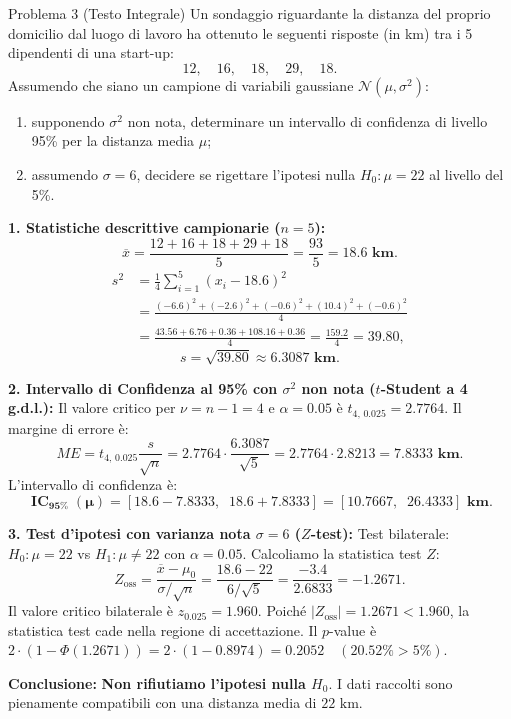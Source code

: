 \documentclass[11pt,a4paper]{article}
\begin{document}
\begin{problemabox}{Problema 3 (Testo Integrale)}
Un sondaggio riguardante la distanza del proprio domicilio dal luogo di lavoro ha ottenuto le seguenti risposte (in km) tra i 5 dipendenti di una start-up:
\[
12, \quad 16, \quad 18, \quad 29, \quad 18.
\]
Assumendo che siano un campione di variabili gaussiane $\mathcal{N}(\mu, \sigma^2)$:
\begin{enumerate}
    \item supponendo $\sigma^2$ non nota, determinare un intervallo di confidenza di livello 95\% per la distanza media $\mu$;
    \item assumendo $\sigma = 6$, decidere se rigettare l'ipotesi nulla $H_0: \mu = 22$ al livello del 5\%.
\end{enumerate}
\end{problemabox}

\begin{soluzionebox}
\textbf{1. Statistiche descrittive campionarie ($n = 5$):}
\[
\overline{x} = \frac{12 + 16 + 18 + 29 + 18}{5} = \frac{93}{5} = \mathbf{18.6\text{ km}}.
\]
\begin{align*}
s^2 &= \frac{1}{4} \sum_{i=1}^5 (x_i - 18.6)^2 \\
&= \frac{(-6.6)^2 + (-2.6)^2 + (-0.6)^2 + (10.4)^2 + (-0.6)^2}{4} \\
&= \frac{43.56 + 6.76 + 0.36 + 108.16 + 0.36}{4} = \frac{159.2}{4} = \mathbf{39.80},
\end{align*}
\[
s = \sqrt{39.80} \approx \mathbf{6.3087\text{ km}}.
\]

\textbf{2. Intervallo di Confidenza al 95\% con $\sigma^2$ non nota ($t$-Student a 4 g.d.l.):}
Il valore critico per $\nu = n-1 = 4$ e $\alpha = 0.05$ è $t_{4, \, 0.025} = 2.7764$.
Il margine di errore è:
\[
ME = t_{4, \, 0.025} \frac{s}{\sqrt{n}} = 2.7764 \cdot \frac{6.3087}{\sqrt{5}} = 2.7764 \cdot 2.8213 = \mathbf{7.8333\text{ km}}.
\]
L'intervallo di confidenza è:
\[
\mathbf{\operatorname{IC}_{95\%}(\mu) = [18.6 - 7.8333, \;\; 18.6 + 7.8333] = [10.7667, \;\; 26.4333]\text{ km}}.
\]

\textbf{3. Test d'ipotesi con varianza nota $\sigma = 6$ ($Z$-test):}
Test bilaterale: $H_0: \mu = 22$ vs $H_1: \mu \neq 22$ con $\alpha = 0.05$.
Calcoliamo la statistica test $Z$:
\[
Z_{\text{oss}} = \frac{\overline{x} - \mu_0}{\sigma/\sqrt{n}} = \frac{18.6 - 22}{6/\sqrt{5}} = \frac{-3.4}{2.6833} = \bm{-1.2671}.
\]
Il valore critico bilaterale è $z_{0.025} = 1.960$.
Poiché $|Z_{\text{oss}}| = 1.2671 < 1.960$, la statistica test cade nella regione di accettazione.
Il $p$-value è $2 \cdot (1 - \Phi(1.2671)) = 2 \cdot (1 - 0.8974) = \bm{0.2052} \quad (\bm{20.52\%} > 5\%)$.

\textbf{Conclusione:} \textbf{Non rifiutiamo l'ipotesi nulla $H_0$}. I dati raccolti sono pienamente compatibili con una distanza media di $22\text{ km}$.
\end{soluzionebox}
\end{document}
